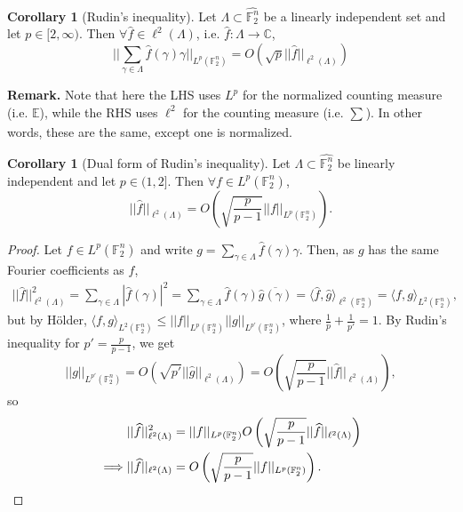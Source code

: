 \documentclass{article}
\theoremstyle{definition}
\newtheorem{cor}[theorem]{Corollary}
\begin{document}
\begin{cor}[Rudin's inequality]\label{cor3.2}
    Let $\Lambda \subset \widehat{\mathbb{F}_2^n}$ be a linearly independent set and let $p \in [2,\infty)$. Then $\forall \widehat{f} \in \ell^2(\Lambda)$, i.e. $\widehat{f} : \Lambda \to \mathbb{C}$,
    \[
    ||\sum_{\gamma \in \Lambda}^{} \widehat{f}(\gamma)\gamma ||_{L^p(\mathbb{F}_2^n)} = O \left(\sqrt{p} ||\widehat{f}||_{\ell^2(\Lambda)}\right)
    \]
\end{cor}
\textbf{Remark.} Note that here the LHS uses $L^p$ for the normalized counting measure (i.e. $\mathbb{E}$), while the RHS uses $\ell^2$ for the counting measure (i.e. $\sum_{}^{} $). In other words, these are the same, except one is normalized. 
\begin{cor}[Dual form of Rudin's inequality]\label{cor3.3}
    Let $\Lambda \subset  \widehat{\mathbb{F}_2^n}$ be linearly independent and let $p \in (1,2]$. Then $\forall f \in L^p (\mathbb{F}_2^n)$, \[
    ||\widehat{f}||_{\ell^2(\Lambda)} = O \left(\sqrt{\frac{p}{p-1}} ||f||_{L^p(\mathbb{F}_2^n)}\right).
    \]
\end{cor}
\begin{proof}
    Let $f \in L^p(\mathbb{F}_2^n)$ and write $g = \sum_{\gamma \in \Lambda}^{} \widehat{f}(\gamma)\gamma$. Then, as $g$ has the same Fourier coefficients as $f$,
    \begin{align*}
        ||\widehat{f}||_{\ell^2(\Lambda)}^2 = \sum_{\gamma \in \Lambda}^{} \left|\widehat{f}(\gamma)\right|^2 = \sum_{\gamma \in \Lambda} \widehat{f}(\gamma)\overline{\widehat{g}(\gamma)} = \langle \widehat{f},\widehat{g} \rangle_{\ell^2(\mathbb{F}_2^n)} = \langle f,g \rangle_{L^2(\mathbb{F}_2^n)},
    \end{align*}
    but by Hölder, $\langle f,g \rangle_{L^2(\mathbb{F}_2^n)} \le ||f||_{L^p(\mathbb{F}_2^n)}||g||_{L^{p'}(\mathbb{F}_2^n)}$, where $\frac{1}{p} + \frac{1}{p'} = 1$. By Rudin's inequality for $p' = \frac{p}{p-1}$, we get \[
    ||g||_{L^{p'}(\mathbb{F}_2^n)} = O \left(\sqrt{p'} ||\widehat{g}||_{\ell^2(\Lambda)}\right) = O \left(\sqrt{\frac{p}{p-1}}||\widehat{f}||_{\ell^2(\Lambda)} \right),
    \]
    so 
    \begin{align*}
        &||\widehat{f}||^2_{\ell^2(\Lambda)} = ||f||_{L^p(\mathbb{F}_2^n)} O \left(\sqrt{\frac{p}{p-1}} ||\widehat{f}||_{\ell^2(\Lambda)}\right) \\
        \implies & ||\widehat{f}||_{\ell^2(\Lambda)} = O \left(\sqrt{\frac{p}{p-1}} ||f||_{L^p(\mathbb{F}_2^n)}\right).
        \qedhere
    \end{align*}
\end{proof}
\end{document}
